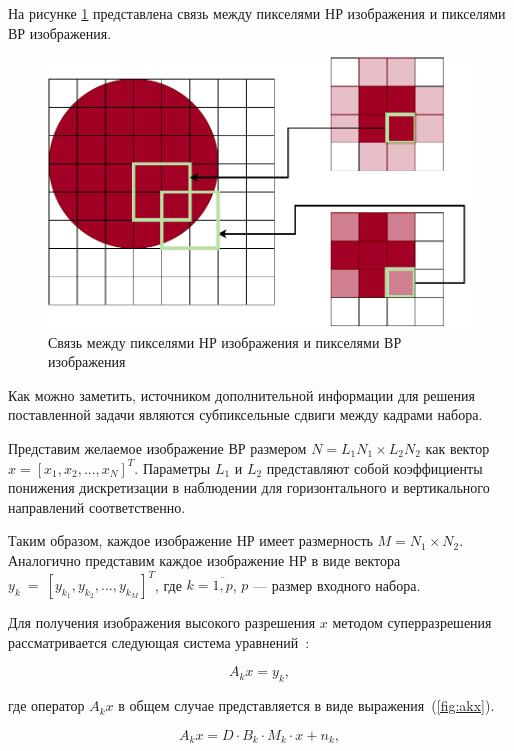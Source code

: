 На рисунке \ref{big} представлена связь между пикселями НР изображения и пикселями ВР изображения.

\begin{figure}[H]
	\centering
	\includegraphics[scale=0.4]{assets/big}
	\caption{Связь между пикселями НР изображения и пикселями ВР изображения}
	\label{big}
\end{figure}

Как можно заметить, источником дополнительной информации для решения поставленной задачи являются субпиксельные сдвиги между кадрами набора.

Представим желаемое изображение ВР размером $N = L_1 N_1 \times L_2 N_2$ как вектор $x = [x_1, x_2, ..., x_N]^T$. Параметры $L_1$ и $L_2$ представляют собой коэффициенты понижения дискретизации в наблюдении для горизонтального и вертикального направлений соответственно. 

Таким образом, каждое изображение НР имеет размерность $M = N_1 \times N_2$. Аналогично представим каждое изображение НР в виде вектора $y_k~=~[y_{k_1}, y_{k_2}, ..., y_{k_M}]^T$, где $k = \overline{1, p}$, $p$ --- размер входного набора.

Для получения изображения высокого разрешения $x$ методом суперразрешения рассматривается следующая система уравнений~\cite{model}:

\begin{equation}
    A_kx = y_k,
\end{equation}

где оператор $A_kx$ в общем случае представляется в виде выражения~(\ref{fig:akx}).

\begin{equation}\label{fig:akx}
    A_kx = D\cdot B_k\cdot M_k \cdot x + n_k,
\end{equation}

